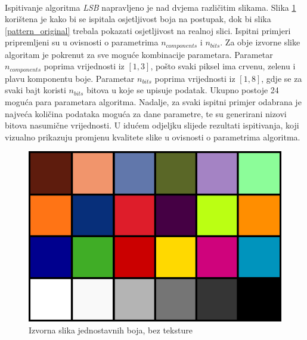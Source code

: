\documentclass[times, utf8, seminar, numeric]{fer}
\begin{document}
\paragraph{}
Ispitivanje algoritma \textit{LSB} napravljeno je nad dvjema različitim slikama. Slika \ref{chart_original} korištena je kako bi se ispitala osjetljivost boja na postupak, dok bi slika \ref{pattern_original} trebala pokazati osjetljivost na realnoj slici. Ispitni primjeri pripremljeni su u ovisnosti o parametrima $n_{components}$ i $n_{bits}$. Za obje izvorne slike algoritam je pokrenut za sve moguće kombinacije parametara. Parametar $n_{components}$ poprima vrijednosti iz $[1,3]$, pošto svaki piksel ima crvenu, zelenu i plavu komponentu boje. Parametar $n_{bits}$ poprima vrijednosti iz $[1,8]$, gdje se za svaki bajt koristi $n_{bits}$ bitova u koje se upisuje podatak. Ukupno postoje 24 moguća para parametara algoritma. Nadalje, za svaki ispitni primjer odabrana je najveća količina podataka moguća za dane parametre, te su generirani nizovi bitova nasumične vrijednosti. U idućem odjeljku slijede rezultati ispitivanja, koji vizualno prikazuju promjenu kvalitete slike u ovisnosti o parametrima algoritma.
\begin{center}
\begin{figure}[ht]
	\caption{Izvorna slika jednostavnih boja, bez teksture}
	\label{chart_original}
	\centerline{
	\includegraphics[scale=0.4]{../benchmark_results/color_chart/original.png}	
	}
\end{figure}
\end{center}
\end{document}
